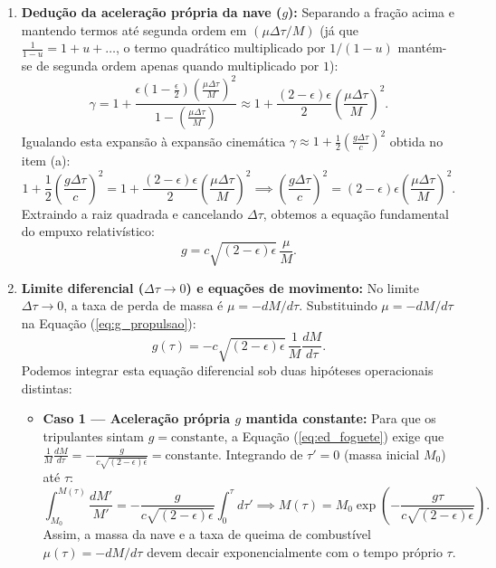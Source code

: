 \documentclass[11pt, a4paper]{article}
\begin{document}
\begin{enumerate}[label=\alph*)]
    \item \textbf{Dedução da aceleração própria da nave ($g$):} Separando a fração acima e mantendo termos até segunda ordem em $(\mu \Delta \tau / M)$ (já que $\frac{1}{1 - u} = 1 + u + \dots$, o termo quadrático multiplicado por $1/(1-u)$ mantém-se de segunda ordem apenas quando multiplicado por $1$):
    \begin{equation}
    \gamma = 1 + \frac{\epsilon \left(1 - \frac{\epsilon}{2}\right) \left(\frac{\mu \Delta \tau}{M}\right)^2}{1 - \left(\frac{\mu \Delta \tau}{M}\right)} \approx 1 + \frac{(2 - \epsilon)\epsilon}{2} \left( \frac{\mu \Delta \tau}{M} \right)^2.
    \end{equation}
    Igualando esta expansão à expansão cinemática $\gamma \approx 1 + \frac{1}{2} \left( \frac{g \Delta \tau}{c} \right)^2$ obtida no item (a):
    \begin{equation}
    1 + \frac{1}{2} \left( \frac{g \Delta \tau}{c} \right)^2 = 1 + \frac{(2 - \epsilon)\epsilon}{2} \left( \frac{\mu \Delta \tau}{M} \right)^2 \implies \left( \frac{g \Delta \tau}{c} \right)^2 = (2 - \epsilon)\epsilon \left( \frac{\mu \Delta \tau}{M} \right)^2.
    \end{equation}
    Extraindo a raiz quadrada e cancelando $\Delta \tau$, obtemos a equação fundamental do empuxo relativístico:
    \begin{equation}
    g = c \sqrt{(2 - \epsilon)\epsilon} \, \frac{\mu}{M}. \label{eq:g_propulsao}
    \end{equation}

    \item \textbf{Limite diferencial ($\Delta \tau \to 0$) e equações de movimento:} No limite $\Delta \tau \to 0$, a taxa de perda de massa é $\mu = -dM/d\tau$. Substituindo $\mu = -dM/d\tau$ na Equação (\ref{eq:g_propulsao}):
    \begin{equation}
    g(\tau) = -c \sqrt{(2 - \epsilon)\epsilon} \, \frac{1}{M} \frac{dM}{d\tau}. \label{eq:ed_foguete}
    \end{equation}
    Podemos integrar esta equação diferencial sob duas hipóteses operacionais distintas:
    \begin{itemize}
        \item \textbf{Caso 1 — Aceleração própria $g$ mantida constante:} Para que os tripulantes sintam $g = \text{constante}$, a Equação (\ref{eq:ed_foguete}) exige que $\frac{1}{M}\frac{dM}{d\tau} = -\frac{g}{c\sqrt{(2-\epsilon)\epsilon}} = \text{constante}$. Integrando de $\tau' = 0$ (massa inicial $M_0$) até $\tau$:
        \begin{equation}
        \int_{M_0}^{M(\tau)} \frac{dM'}{M'} = -\frac{g}{c \sqrt{(2 - \epsilon)\epsilon}} \int_{0}^{\tau} d\tau' \implies M(\tau) = M_0 \exp\left( -\frac{g \tau}{c \sqrt{(2 - \epsilon)\epsilon}} \right).
        \end{equation}
        Assim, a massa da nave e a taxa de queima de combustível $\mu(\tau) = -dM/d\tau$ devem decair exponencialmente com o tempo próprio $\tau$.


\end{itemize}
\end{enumerate}
\end{document}
